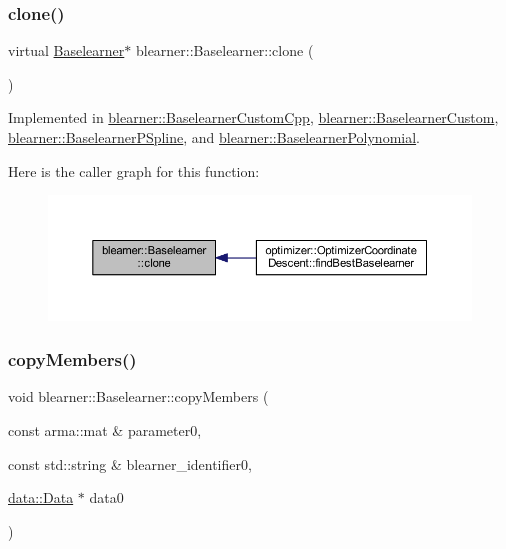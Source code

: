 \subsubsection{\texorpdfstring{clone()}{clone()}}
{\footnotesize\ttfamily virtual \hyperlink{classblearner_1_1_baselearner}{Baselearner}$\ast$ blearner\+::\+Baselearner\+::clone (\begin{DoxyParamCaption}{ }\end{DoxyParamCaption})\hspace{0.3cm}{\ttfamily [pure virtual]}}



Implemented in \hyperlink{classblearner_1_1_baselearner_custom_cpp_a8478407ac4d8ed118fd1381f65df150a}{blearner\+::\+Baselearner\+Custom\+Cpp}, \hyperlink{classblearner_1_1_baselearner_custom_a1442790658c7ad08832a94fbc60ff94a}{blearner\+::\+Baselearner\+Custom}, \hyperlink{classblearner_1_1_baselearner_p_spline_aea7d3c0ef6d77ffb8a2fb2000fae6399}{blearner\+::\+Baselearner\+P\+Spline}, and \hyperlink{classblearner_1_1_baselearner_polynomial_a4afd811448bd6d387b721cc48b84da26}{blearner\+::\+Baselearner\+Polynomial}.

Here is the caller graph for this function\+:\nopagebreak
\begin{figure}[H]
\begin{center}
\leavevmode
\includegraphics[width=350pt]{classblearner_1_1_baselearner_a8e12c6739f085917a7d2da6570c51a21_icgraph}
\end{center}
\end{figure}
\mbox{\label{classblearner_1_1_baselearner_ae8f114ca7c497f03c80de5981c7f811d}} 
\subsubsection{\texorpdfstring{copy\+Members()}{copyMembers()}}
{\footnotesize\ttfamily void blearner\+::\+Baselearner\+::copy\+Members (\begin{DoxyParamCaption}\item[{const arma\+::mat \&}]{parameter0,  }\item[{const std\+::string \&}]{blearner\+\_\+identifier0,  }\item[{\hyperlink{classdata_1_1_data}{data\+::\+Data} $\ast$}]{data0 }\end{DoxyParamCaption})}

